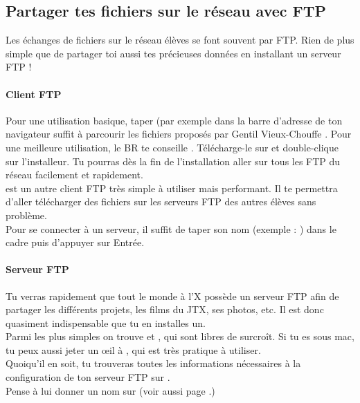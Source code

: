 \subsection{Partager tes fichiers sur le r\'eseau avec FTP}

Les \'echanges de fichiers sur le r\'eseau \'el\`eves se font souvent par FTP. Rien de plus simple que de partager toi aussi tes pr\'ecieuses donn\'ees en installant un serveur FTP !

\paragraph{Client FTP}
Pour une utilisation basique, taper   (par exemple  dans la barre d'adresse de ton navigateur suffit \`a parcourir les fichiers propos\'es par \og Gentil Vieux-Chouffe \fg.
Pour une meilleure utilisation, le BR te conseille . T\'el\'echarge-le sur  et double-clique sur l'installeur.
Tu pourras d\`es la fin de l'installation aller sur tous les FTP du r\'eseau facilement et rapidement.\\
  est un autre client FTP tr\`es simple \`a  utiliser mais performant. Il te permettra d'aller t\'el\'echarger des fichiers sur les serveurs FTP des autres \'el\`eves sans probl\`eme.\\
Pour se connecter \`a  un serveur, il suffit de taper son nom (exemple : ) dans le cadre  puis d'appuyer sur Entr\'ee.\\


\paragraph{Serveur FTP}
Tu verras rapidement que tout le monde \`a  l'X poss\`ede un serveur FTP
afin de partager les diff\'erents projets, les films du JTX, ses
photos, etc. Il est donc quasiment indispensable que tu en installes un.\\

Parmi les plus simples on trouve  et , qui sont libres de surcro\^{i}t.
Si tu es sous mac, tu peux aussi jeter un \oe{}il à , qui est très pratique à utiliser.\\
Quoiqu'il en soit, tu trouveras toutes les informations n\'ecessaires \`a la configuration de ton serveur FTP sur .\\
Pense \`a lui donner un nom sur  (voir aussi page \pageref{dnsapp}.)
